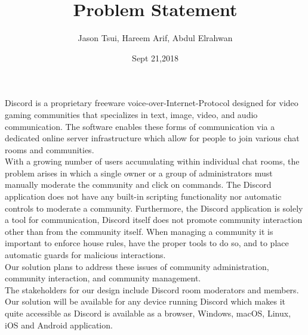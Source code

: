 \documentclass[12pt]{article}
\title{Problem Statement}
\author{Jason Tsui, Hareem Arif, Abdul Elrahwan}
\date{Sept 21,2018}
\begin{document}
\maketitle

Discord is a proprietary freeware voice-over-Internet-Protocol designed for video gaming communities that specializes in text, image, video, and audio communication. The software enables these forms of communication via a dedicated online server infrastructure which allow for people to join various chat rooms and communities. \\


With a growing number of users accumulating within individual chat rooms, the problem arises in which a single owner or a group of administrators must manually moderate the community and click on commands. The Discord application does not have any built-in scripting functionality nor automatic controls to moderate a community. Furthermore, the Discord application is solely a tool for communication, Discord itself does not promote community interaction other than from the community itself. When managing a community it is important to enforce house rules, have the proper tools to do so, and to place automatic guards for malicious interactions. \\

	Our solution plans to address these issues of community administration, community interaction, and community management.\\

	The stakeholders for our design include Discord room moderators and members. Our solution will be available for any device running Discord which makes it quite accessible as Discord is available as a browser, Windows, macOS, Linux, iOS and Android application.
\end{document}
